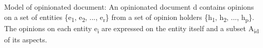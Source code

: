 Model of opinionated document: An opinionated document d contains opinions on a set of entities \{e\textsubscript{1}, e\textsubscript{2}, ..., e\textsubscript{r}\} from a set of opinion holders \{h\textsubscript{1}, h\textsubscript{2}, ..., h\textsubscript{p}\}. The opinions on each entity e\textsubscript{i} are expressed on the entity itself and a subset A\textsubscript{id} of its aspects.
                                                                                                                                                                                                                                                                                                                                                                                                                                                                                                                                                                                                                                                                                                                                                                                                                                                                                                                                                                                                                                                                                                                                                                                                                                                                                                                                                                                                                                                                                                                                                                                                                                                                                                                                                                                                                                                                                                                                                                                                                                                                                                                                                                                                                                                                                                                                                                                                                                                                                                                                                                                                                                                                                                                                                                                                                                                                                                                                                                                                                                                              